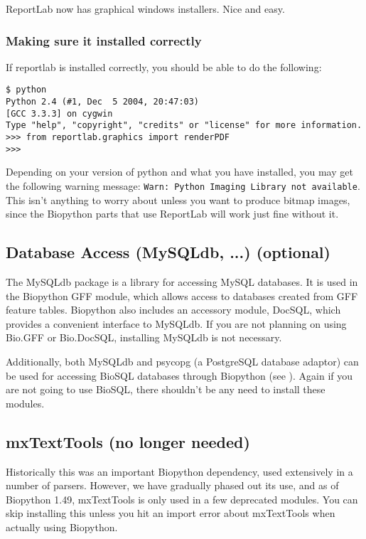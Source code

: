 \documentclass{article}
\begin{document}
ReportLab now has graphical windows installers.  Nice and easy.

\subsubsection{Making sure it installed correctly}

If reportlab is installed correctly, you should be able to do the
following:

\begin{verbatim}
$ python
Python 2.4 (#1, Dec  5 2004, 20:47:03)
[GCC 3.3.3] on cygwin
Type "help", "copyright", "credits" or "license" for more information.
>>> from reportlab.graphics import renderPDF
>>>
\end{verbatim}

Depending on your version of python and what you have installed, you may
get the following warning message: 
\verb|Warn: Python Imaging Library not available|.  This isn't anything
to worry about unless you want to produce bitmap images, since the
Biopython parts that use ReportLab will work just fine without it.

\subsection{Database Access (MySQLdb, ...) (optional)}

The MySQLdb package is a library for accessing MySQL databases. It is
used in the Biopython GFF module, which allows access to databases
created from GFF feature tables. Biopython also includes an accessory
module, DocSQL, which provides a convenient interface to MySQLdb. 
If you are not planning on using Bio.GFF or Bio.DocSQL, installing
MySQLdb is not necessary.

Additionally, both MySQLdb and psycopg (a PostgreSQL database adaptor)
can be used for accessing BioSQL databases through Biopython
(see ). Again if
you are not going to use BioSQL, there shouldn't be any need to install
these modules.

\subsection{mxTextTools (no longer needed)}

Historically this was an important Biopython dependency, used extensively
in a number of parsers.  However, we have gradually phased out its use,
and as of Biopython 1.49, mxTextTools is only used in a few deprecated
modules.  You can skip installing this unless you hit an import error
about mxTextTools when actually using Biopython.
\end{document}
